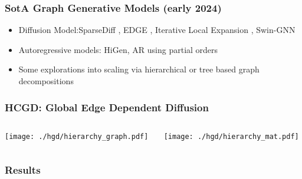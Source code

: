 \documentclass[./presentation.tex]{subfiles}
\begin{document}
\begin{frame}[t,label=hcgd]
  \frametitle{SotA Graph Generative Models (early 2024)}
  \label{frame:sota2023}
  \begin{itemize}
    \item Diffusion Model:SparseDiff \citep{qinSparseTrainingDiscrete2023e}, EDGE \citep{chenEfficientDegreeGuidedGraph2023g}, Iterative Local Expansion \citep{bergmeisterEfficientScalableGraph2024}, Swin-GNN \citep{yanSwinGNNRethinkingPermutation2023b}
    \item Autoregressive models: HiGen\citep{karamiHiGenHierarchicalGraph2023a}, AR using partial orders \citep{zhaoPardPermutationInvariantAutoregressive2024a}
    \item Some explorations into scaling via hierarchical \citep{daviesSizeMattersLarge2023c,lemaireSANGEAScalableAttributed2023} or tree based graph decompositions\citep{shirzadTDGENGraphGeneration2022a}
  \end{itemize}
\end{frame}
\begin{frame}[label=hcgd]
  \frametitle{HCGD: Global Edge Dependent Diffusion}
  \begin{columns}
    \begin{column}{0.5\textwidth}
  \texttt{[image: ./hgd/hierarchy\_graph.pdf]}
    \end{column}
    \begin{column}{0.5\textwidth}
   \texttt{[image: ./hgd/hierarchy\_mat.pdf]}
    \end{column}
  \end{columns}
\end{frame}



\begin{frame}[c,label=hcgd]
  \frametitle{Results}
\end{frame}
\end{document}
